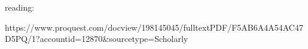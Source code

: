 reading:

https://www.proquest.com/docview/198145045/fulltextPDF/F5AB6A4A54AC47D5PQ/1?accountid=12870&sourcetype=Scholarly%